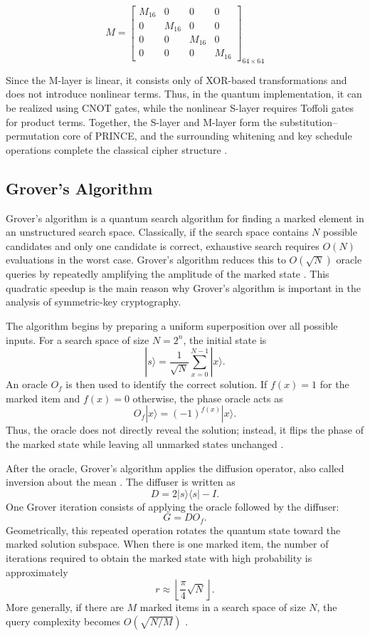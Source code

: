 \documentclass[11pt,a4paper]{article}
\begin{document}
\vspace{0.6cm}
\[
M =
\begin{bmatrix}
M_{16} & 0 & 0 & 0 \\
0 & M_{16} & 0 & 0 \\
0 & 0 & M_{16} & 0 \\
0 & 0 & 0 & M_{16}
\end{bmatrix}_{64 \times 64}
\]

Since the M-layer is linear, it consists only of XOR-based transformations and does not introduce nonlinear terms. Thus, in the quantum implementation, it can be realized using CNOT gates, while the nonlinear S-layer requires Toffoli gates for product terms. Together, the S-layer and M-layer form the substitution--permutation core of PRINCE, and the surrounding whitening and key schedule operations complete the classical cipher structure \cite{borghoff2012prince}.

\subsection{Grover's Algorithm}

Grover's algorithm is a quantum search algorithm for finding a marked element in an unstructured search space. Classically, if the search space contains $N$ possible candidates and only one candidate is correct, exhaustive search requires $O(N)$ evaluations in the worst case. Grover's algorithm reduces this to $O(\sqrt{N})$ oracle queries by repeatedly amplifying the amplitude of the marked state \cite{grover1996fast,grover1997quantum,boyer1998tight,brassard2002amplitude}. This quadratic speedup is the main reason why Grover's algorithm is important in the analysis of symmetric-key cryptography.

The algorithm begins by preparing a uniform superposition over all possible inputs. For a search space of size $N=2^n$, the initial state is
\[
|s\rangle =
\frac{1}{\sqrt{N}}
\sum_{x=0}^{N-1} |x\rangle .
\]
An oracle $O_f$ is then used to identify the correct solution. If $f(x)=1$ for the marked item and $f(x)=0$ otherwise, the phase oracle acts as
\[
O_f |x\rangle = (-1)^{f(x)} |x\rangle .
\]
Thus, the oracle does not directly reveal the solution; instead, it flips the phase of the marked state while leaving all unmarked states unchanged \cite{nielsen2010quantum}.

After the oracle, Grover's algorithm applies the diffusion operator, also called inversion about the mean \cite{grover1997quantum,nielsen2010quantum}. The diffuser is written as
\[
D = 2|s\rangle\langle s| - I .
\]
One Grover iteration consists of applying the oracle followed by the diffuser:
\[
G = D O_f .
\]
Geometrically, this repeated operation rotates the quantum state toward the marked solution subspace. When there is one marked item, the number of iterations required to obtain the marked state with high probability is approximately
\[
r \approx \left\lfloor \frac{\pi}{4}\sqrt{N} \right\rfloor .
\]
More generally, if there are $M$ marked items in a search space of size $N$, the query complexity becomes $O(\sqrt{N/M})$ \cite{boyer1998tight}.
\end{document}
